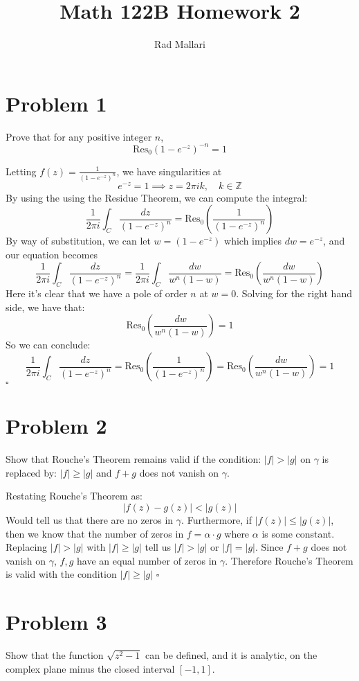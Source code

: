 \documentclass[11pt]{article}
\title{Math 122B Homework 2}
\author{Rad Mallari}
\newcommand{\Z}{\mathbb{Z}}
\newenvironment{proof}{\noindent{\bf Proof.}}{\hfill $\square$\medskip}
\begin{document}
\maketitle

\section{Problem 1}
Prove that for any positive integer $n$,
$$\text{Res}_{0}(1-e^{-z})^{-n}=1$$

\begin{proof}
Letting $f(z)=\frac{1}{(1-e^{-z})^{n}}$, we have singularities at
$$e^{-z}=1\implies z=2\pi ik,\quad k\in\Z$$
By using the using the Residue Theorem, we can compute the integral:
$$\frac{1}{2\pi i}\int_{C}\frac{dz}{(1-e^{-z})^{n}}=\text{Res}_{0}\left(\frac{1}{(1-e^{-z})^{n}}\right)$$
By way of substitution, we can let $w=(1-e^{-z})$ which implies $dw=e^{-z}$, and our equation becomes
$$\frac{1}{2\pi i}\int_{C}\frac{dz}{(1-e^{-z})^{n}}=\frac{1}{2\pi i}\int_{C}\frac{dw}{w^{n}(1-w)}=\text{Res}_{0}\left(\frac{dw}{w^{n}(1-w)}\right)$$
Here it's clear that we have a pole of order $n$ at $w=0$. Solving for the right hand side, we have that:
$$\text{Res}_{0}\left(\frac{dw}{w^{n}(1-w)}\right)=1$$ 
So we can conclude:
$$\frac{1}{2\pi i}\int_{C}\frac{dz}{(1-e^{-z})^{n}}=\text{Res}_{0}\left(\frac{1}{(1-e^{-z})^{n}}\right)=\text{Res}_{0}\left(\frac{dw}{w^{n}(1-w)}\right)=1$$
\end{proof}

\section{Problem 2}
Show that Rouche's Theorem remains valid if the condition: $|f|>|g|$ on $\gamma$ is replaced by:
$|f|\geq|g|$ and $f+g$ does not vanish on $\gamma$.

\begin{proof}
Restating Rouche's Theorem as:
$$|f(z)-g(z)|<|g(z)|$$
Would tell us that there are no zeros in $\gamma$. Furthermore, if $|f(z)|\leq|g(z)|$, then we know that the number of zeros in $f=\alpha\cdot g$ where $\alpha$ is some constant. Replacing $|f|>|g|$ with $|f|\geq|g|$ tell us $|f|>|g|$ or $|f|=|g|$. Since $f+g$ does not vanish on $\gamma$, $f,g$ have an equal number of zeros in $\gamma$. Therefore Rouche's Theorem is valid with the condition $|f|\geq|g|$
\end{proof}

\section{Problem 3}
Show that the function $\sqrt{z^{2}-1}$ can be defined, and it is analytic, on the complex plane
minus the closed interval $[-1,1]$.
\end{document}
